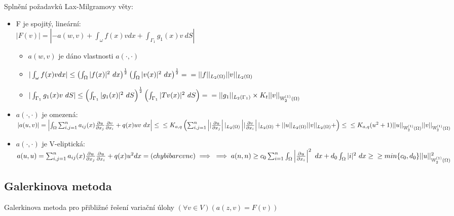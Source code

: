 \documentclass[../main.tex]{subfiles}
\begin{document}
\begin{remark}
Splnění požadavků Lax-Milgramovy věty:
\begin{itemize}
    \item F je spojitý, lineární:\\ $|F(v)| = |-a(w,v) + \int_\omega f(x)vdx + \int_{\Gamma_1}g_1(x)v\ dS|$ 
        \begin{itemize}
            \item $a(w,v)$ je dáno vlastnosti $a(\cdot,\cdot)$
            \item $|\int_\omega f(x)vdx| \leq \left( \int_\Omega |f(x)|^2\ dx \right)^{\frac{1}{2}}  \left( \int_\Omega |v(x)|^2\ dx \right)^{\frac{1}{2}} =\\= ||f||_{L_2(\Omega)}||v||_{L_2(\Omega)}$
            \item $|\int_{\Gamma_1}g_1(x)v\ dS| \leq \left( \int_{\Gamma_1} |g_1(x)|^2\ dS \right)^{\frac{1}{2}}  \left( \int_{\Gamma_1} |Tv(x)|^2\ dS \right) =\\= ||g_1||_{L_2(\Gamma_1)} \times K_t||v||_{\mathbb{W}_2^{(1)}(\Omega)}$
        \end{itemize}
    \item $a(\cdot, \cdot)$ je omezená:\\ $|a(u,v)| = \left| \int_\Omega \sum_{i,j=1}^n a_{ij}(x)\frac{\partial u}{\partial x_j}\frac{\partial v}{\partial x_i} + q(x)uv \ dx   \right| \leq \\ \leq K_{a,q} \left( \sum_{i,j=1}^n \left|| \frac{\partial u}{\partial x_j}\right||_{L_2(\Omega)} \left||\frac{\partial v} {\partial x_i} \right||_{L_2(\Omega)} + ||u||_{L_2(\Omega)} ||v||_{L_2(\Omega)}  +  \right) \leq \\ \leq K_{a,q}(u^2 + 1) ||u||_{\mathbb{W}_2^{(1)}(\Omega)} ||v||_{\mathbb{W}_2^{(1)}(\Omega)}$
    \item $a(\cdot,\cdot)$ je V-eliptická:\\ $a(u,u) = \sum_{i,j=1}^n a_{ij}(x)\frac{\partial u}{\partial x_j}\frac{\partial u}{\partial x_i} + q(x)u^2 dx = (chybi barevne) \implies \\ \implies a(n,n)\geq c_0 \sum_{i=1}^n \int_\Omega \left|  \frac{\partial u}{\partial x_i}    \right|^2\ dx + d_0 \int_\Omega|i|^2\ dx \geq \\ \geq min \{c_0, d_0 \} ||u||^2_{\mathbb{W}_2^{(1)}(\Omega)}$
\end{itemize}

\end{remark}


\subsection{Galerkinova metoda}\label{Galerkin}
Galerkinova metoda pro přibližné řešení variační úlohy  $(\forall v \in V)(a(z,v) = F(v))$
\end{document}

